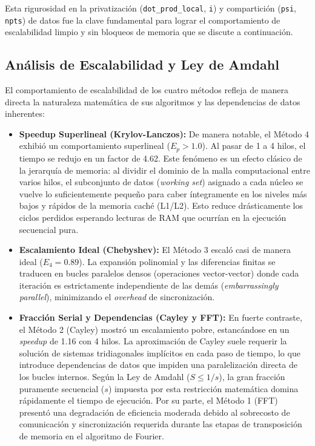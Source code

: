 \documentclass[12pt, a4paper]{article}
\begin{document}
Esta rigurosidad en la privatización (\texttt{dot\_prod\_local}, \texttt{i}) y compartición (\texttt{psi}, \texttt{npts}) de datos fue la clave fundamental para lograr el comportamiento de escalabilidad limpio y sin bloqueos de memoria que se discute a continuación.

\subsection{Análisis de Escalabilidad y Ley de Amdahl}

El comportamiento de escalabilidad de los cuatro métodos refleja de manera directa la naturaleza matemática de sus algoritmos y las dependencias de datos inherentes:

\begin{itemize}
    \item \textbf{Speedup Superlineal (Krylov-Lanczos):} De manera notable, el Método 4 exhibió un comportamiento superlineal ($E_p > 1.0$). Al pasar de 1 a 4 hilos, el tiempo se redujo en un factor de 4.62. Este fenómeno es un efecto clásico de la jerarquía de memoria: al dividir el dominio de la malla computacional entre varios hilos, el subconjunto de datos (\textit{working set}) asignado a cada núcleo se vuelve lo suficientemente pequeño para caber íntegramente en los niveles más bajos y rápidos de la memoria caché (L1/L2). Esto reduce drásticamente los ciclos perdidos esperando lecturas de RAM que ocurrían en la ejecución secuencial pura.

    \item \textbf{Escalamiento Ideal (Chebyshev):} El Método 3 escaló casi de manera ideal ($E_4 = 0.89$). La expansión polinomial y las diferencias finitas se traducen en bucles paralelos densos (operaciones vector-vector) donde cada iteración es estrictamente independiente de las demás (\textit{embarrassingly parallel}), minimizando el \textit{overhead} de sincronización.

    \item \textbf{Fracción Serial y Dependencias (Cayley y FFT):} En fuerte contraste, el Método 2 (Cayley) mostró un escalamiento pobre, estancándose en un \textit{speedup} de 1.16 con 4 hilos. La aproximación de Cayley suele requerir la solución de sistemas tridiagonales implícitos en cada paso de tiempo, lo que introduce dependencias de datos que impiden una paralelización directa de los bucles internos. Según la Ley de Amdahl ($S \leq 1/s$), la gran fracción puramente secuencial ($s$) impuesta por esta restricción matemática domina rápidamente el tiempo de ejecución. Por su parte, el Método 1 (FFT) presentó una degradación de eficiencia moderada debido al sobrecosto de comunicación y sincronización requerida durante las etapas de transposición de memoria en el algoritmo de Fourier.
\end{itemize}
\end{document}
